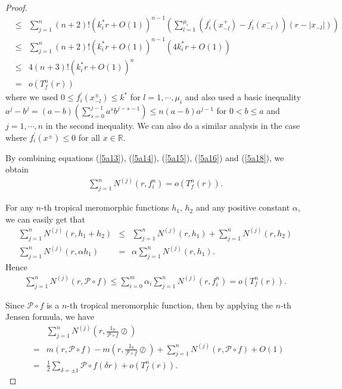 \documentclass[10pt,a4paper]{amsart}
\begin{document}
\begin{proof}
\begin{eqnarray}
        &\leq&\sum_{j=1}^{n}(n+2)!\left(k_{i}^{*}r+O(1)\right)^{n-1}\left(\sum_{l=1}^{\mu_{i}}(f_{i}^{'}(x_{-l}^{+})-f_{i}^{'}(x_{-l}^{-}))(r-|x_{-l}|)\right)\nonumber\\
        &\leq&\sum_{j=1}^{n}(n+2)!\left(k_{i}^{*}r+O(1)\right)^{n-1}\left(4k_{i}^{*}r+O(1)\right)\nonumber\\
        &\leq&4(n+3)!\left(k_{i}^{*}r+O(1)\right)^{n}\nonumber\\
        &=&o(T_{f}^{n}(r))
    \end{eqnarray}
    where we used $0\leq f_{i}^{'}(x_{-l}^{\pm})\leq k^{*}$ for $l=1, \cdots, \mu_{i}$ and also used a basic inequality $a^{j}-b^{j}=(a-b)(\sum_{s=0}^{j-1}a^{s}b^{j-s-1})\leq n(a-b)a^{j-1}$ for $0<b\leq a$ and $j=1, \cdots, n$ in the second inequality. We can also do a similar analysis in the case where $f_{i}^{'}(x^{\pm})\leq 0$ for all $x\in\mathbb{R}$.

    By combining equations (\ref{5a13}), (\ref{5a14}), (\ref{5a15}), (\ref{5a16}) and (\ref{5a18}), we obtain
    \begin{eqnarray}\label{5a19}
        \sum_{j=1}^{n}N^{(j)}(r, f_{i}^{n})=o(T_{f}^{n}(r)).
    \end{eqnarray}
    
    For any $n$-th tropical meromorphic functions $h_{1}$, $h_{2}$ and any positive constant $\alpha$, we can easily get that
    \begin{eqnarray*}
        \sum_{j=1}^{n}N^{(j)}(r, h_{1}+h_{2})&\leq& \sum_{j=1}^{n}N^{(j)}(r, h_{1})+\sum_{j=1}^{n}N^{(j)}(r, h_{2})\\
        \sum_{j=1}^{n}N^{(j)}(r, \alpha h_{1})&=&\alpha \sum_{j=1}^{n}N^{(j)}(r, h_{1}).
    \end{eqnarray*}
    Hence
    \begin{eqnarray*}
        \sum_{j=1}^{n}N^{(j)}(r, \mathcal{P}\circ f)\leq \sum_{i=0}^{m}\alpha_{i}\sum_{j=1}^{n}N^{(j)}(r, f_{i}^{n})=o(T_{f}^{n}(r)).
    \end{eqnarray*}

    Since $\mathcal{P}\circ f$ is a $n$-th tropical meromorphic function, then by applying the $n$-th Jensen formula, we have
    \begin{eqnarray}\label{Pn}
        &&\sum_{j=1}^{n}N^{(j)}\left(r, \frac{1_{0}}{\mathcal{P}\circ f}\oslash\right)\nonumber\\
        &=&m(r, \mathcal{P}\circ f)-m\left(r, \frac{1_{0}}{\mathcal{P}\circ f}\oslash\right)+\sum_{j=1}^{n}N^{(j)}\left(r, \mathcal{P}\circ f\right)+O(1)\nonumber\\
        &=&\frac{1}{2}\sum_{\delta=\pm 1}\mathcal{P}\circ f(\delta r)+o(T_{f}^{n}(r)).
    \end{eqnarray}


\end{proof}
\end{document}
